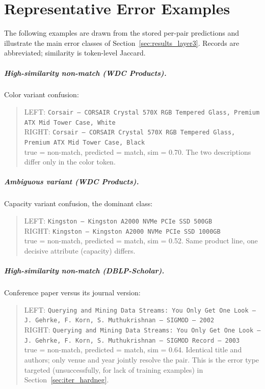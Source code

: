\documentclass[a4paper,oneside,bibliography=totoc]{scrbook}
\begin{document}
\chapter{Representative Error Examples}
\label{app:errors}

The following examples are drawn from the stored per-pair predictions and illustrate the main error classes of Section~\ref{sec:results_layer3}. Records are abbreviated; similarity is token-level Jaccard.

\paragraph{High-similarity non-match (WDC Products).} Color variant confusion:
\begin{quote}\small\raggedright
LEFT: \texttt{Corsair -- CORSAIR Crystal 570X RGB Tempered Glass, Premium ATX Mid Tower Case, White} \\
RIGHT: \texttt{Corsair -- CORSAIR Crystal 570X RGB Tempered Glass, Premium ATX Mid Tower Case, Black} \\
true = non-match, predicted = match, sim = 0.70. The two descriptions differ only in the color token.
\end{quote}

\paragraph{Ambiguous variant (WDC Products).} Capacity variant confusion, the dominant class:
\begin{quote}\small\raggedright
LEFT: \texttt{Kingston -- Kingston A2000 NVMe PCIe SSD 500GB} \\
RIGHT: \texttt{Kingston -- Kingston A2000 NVMe PCIe SSD 1000GB} \\
true = non-match, predicted = match, sim = 0.52. Same product line, one decisive attribute (capacity) differs.
\end{quote}

\paragraph{High-similarity non-match (DBLP-Scholar).} Conference paper versus its journal version:
\begin{quote}\small\raggedright
LEFT: \texttt{Querying and Mining Data Streams: You Only Get One Look -- J. Gehrke, F. Korn, S. Muthukrishnan -- SIGMOD -- 2002} \\
RIGHT: \texttt{Querying and Mining Data Streams: You Only Get One Look -- J. Gehrke, F. Korn, S. Muthukrishnan -- SIGMOD Record -- 2003} \\
true = non-match, predicted = match, sim = 0.64. Identical title and authors; only venue and year jointly resolve the pair. This is the error type targeted (unsuccessfully, for lack of training examples) in Section~\ref{sec:iter_hardneg}.
\end{quote}
\end{document}
